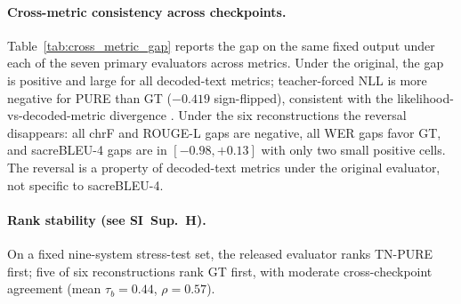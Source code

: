 \documentclass[pdflatex,sn-chicago]{sn-jnl}
\begin{document}
\paragraph{Cross-metric consistency across checkpoints.}
Table~\ref{tab:cross_metric_gap} reports the gap on the same fixed output under each of the seven primary evaluators across metrics. Under the original, the gap is positive and large for all decoded-text metrics; teacher-forced NLL is more negative for PURE than GT ($-0.419$ sign-flipped), consistent with the likelihood-vs-decoded-metric divergence \cite{jiang2025meaningful}. Under the six reconstructions the reversal disappears: all chrF and ROUGE-L gaps are negative, all WER gaps favor GT, and sacreBLEU-4 gaps are in $[-0.98, +0.13]$ with only two small positive cells. The reversal is a property of decoded-text metrics under the original evaluator, not specific to sacreBLEU-4.

\paragraph{Rank stability (see SI~Sup.~H).}
On a fixed nine-system stress-test set, the released evaluator ranks TN-PURE first; five of six reconstructions rank GT first, with moderate cross-checkpoint agreement (mean $\tau_b{=}0.44$, $\rho{=}0.57$).
\end{document}
